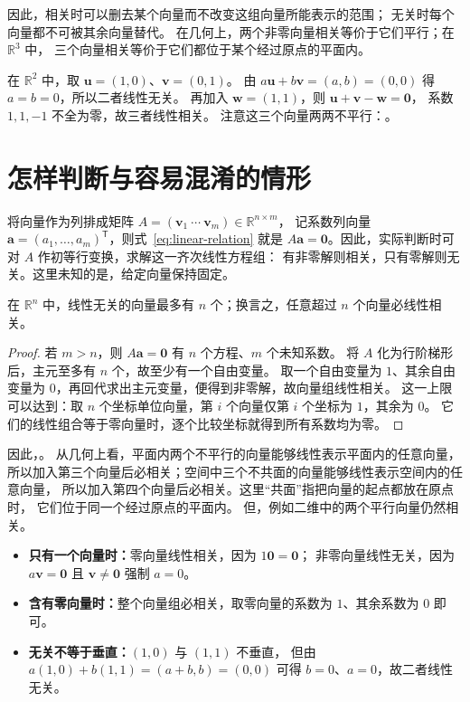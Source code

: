 \documentclass[UTF8,12pt,a4paper,fontset=fandol]{ctexart}
\begin{document}
因此，相关时可以删去某个向量而不改变这组向量所能表示的范围；
无关时每个向量都不可被其余向量替代。
在几何上，两个非零向量相关等价于它们平行；在 $\mathbb R^3$ 中，
三个向量相关等价于它们都位于某个经过原点的平面内。

\begin{example}[无关的一组与相关的一组]
在 $\mathbb R^2$ 中，取 $\boldsymbol{u}=(1,0)$、$\boldsymbol{v}=(0,1)$。
由 $a\boldsymbol{u}+b\boldsymbol{v}=(a,b)=(0,0)$ 得 $a=b=0$，所以二者线性无关。
再加入 $\boldsymbol{w}=(1,1)$，则
$\boldsymbol{u}+\boldsymbol{v}-\boldsymbol{w}=\boldsymbol{0}$，
系数 $1,1,-1$ 不全为零，故三者线性相关。
注意这三个向量两两不平行：。
\end{example}

\section{怎样判断与容易混淆的情形}

将向量作为列排成矩阵 $A=(\boldsymbol{v}_1\ \cdots\ \boldsymbol{v}_m)\in\mathbb R^{n\times m}$，
记系数列向量 $\boldsymbol{a}=(a_1,\ldots,a_m)^{\mathsf T}$，则式~\eqref{eq:linear-relation} 就是
$A\boldsymbol{a}=\boldsymbol{0}$。因此，实际判断时可对 $A$ 作初等行变换，求解这一齐次线性方程组：
有非零解则相关，只有零解则无关。这里未知的是，给定向量保持固定。

\begin{proposition}[线性无关向量的数量上限]
在 $\mathbb R^n$ 中，线性无关的向量最多有 $n$ 个；换言之，任意超过 $n$ 个向量必线性相关。
\end{proposition}

\begin{proof}
若 $m>n$，则 $A\boldsymbol{a}=\boldsymbol{0}$ 有 $n$ 个方程、$m$ 个未知系数。
将 $A$ 化为行阶梯形后，主元至多有 $n$ 个，故至少有一个自由变量。
取一个自由变量为 $1$、其余自由变量为 $0$，再回代求出主元变量，便得到非零解，故向量组线性相关。
这一上限可以达到：取 $n$ 个坐标单位向量，第 $i$ 个向量仅第 $i$ 个坐标为 $1$，其余为 $0$。
它们的线性组合等于零向量时，逐个比较坐标就得到所有系数均为零。
\end{proof}

因此，。
从几何上看，平面内两个不平行的向量能够线性表示平面内的任意向量，
所以加入第三个向量后必相关；空间中三个不共面的向量能够线性表示空间内的任意向量，
所以加入第四个向量后必相关。这里“共面”指把向量的起点都放在原点时，
它们位于同一个经过原点的平面内。
但，例如二维中的两个平行向量仍然相关。

\begin{itemize}
  \item \textbf{只有一个向量时：}零向量线性相关，因为 $1\boldsymbol{0}=\boldsymbol{0}$；
  非零向量线性无关，因为 $a\boldsymbol{v}=\boldsymbol{0}$ 且 $\boldsymbol{v}\neq\boldsymbol{0}$ 强制 $a=0$。
  \item \textbf{含有零向量时：}整个向量组必相关，取零向量的系数为 $1$、其余系数为 $0$ 即可。
  \item \textbf{无关不等于垂直：}$(1,0)$ 与 $(1,1)$ 不垂直，
  但由 $a(1,0)+b(1,1)=(a+b,b)=(0,0)$ 可得 $b=0$、$a=0$，故二者线性无关。
\end{itemize}
\end{document}
